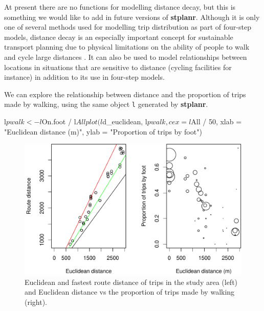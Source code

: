 At present there are no functions for modelling distance decay, but this
is something we would like to add in future versions of
\textbf{stplanr}.
Although it is only one of several methods used for modelling trip distribution as part of four-step models,
distance decay is an especially important concept for
sustainable transport planning due to physical limitations on the
ability of people to walk and cycle large distances
\citep{iacono_measuring_2010}.
It can also be used to model relationships between locations in situations that are sensitive to distance (cycling facilities for instance) in addition to its use in four-step models.

We can explore the relationship between distance and the proportion of
trips made by walking, using the same object \texttt{l} generated by
\textbf{stplanr}.

\begin{Schunk}
\begin{Sinput}
l$pwalk <- l$On.foot / l$All
plot(l$d_euclidean, l$pwalk, cex = l$All / 50,
  xlab = "Euclidean distance (m)", ylab = "Proportion of trips by foot")
\end{Sinput}
\end{Schunk}

\begin{Schunk}
\begin{figure}
\includegraphics[width=1\linewidth]{euclidfastest-1} \caption[Euclidean and fastest route distance of trips in the study area (left) and Euclidean distance vs the proportion of trips made by walking (right)]{Euclidean and fastest route distance of trips in the study area (left) and Euclidean distance vs the proportion of trips made by walking (right).}\label{fig:euclidfastest}
\end{figure}
\end{Schunk}

